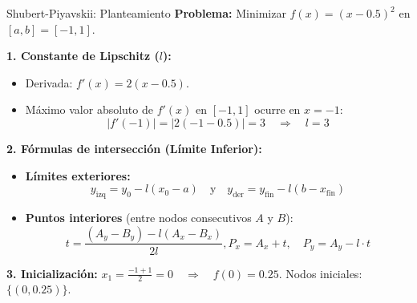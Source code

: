 \begin{frame}{Shubert-Piyavskii: Planteamiento}
    \textbf{Problema:} Minimizar \(f(x) = (x - 0.5)^2\) en \([a, b] = [-1, 1]\).
    
    \vspace{0.3cm}
    \textbf{1. Constante de Lipschitz (\(l\)):}
    \begin{itemize}
        \item Derivada: \(f'(x) = 2(x - 0.5)\).
        \item Máximo valor absoluto de \(f'(x)\) en \([-1, 1]\) ocurre en \(x = -1\): 
        \[ |f'(-1)| = |2(-1 - 0.5)| = 3 \quad \Rightarrow \quad l = 3 \]
    \end{itemize}

    \textbf{2. Fórmulas de intersección (Límite Inferior):}
    \begin{itemize}
        \item \textbf{Límites exteriores:}
        \[ y_{\text{izq}} = y_0 - l(x_0 - a) \quad \text{y} \quad y_{\text{der}} = y_{\text{fin}} - l(b - x_{\text{fin}}) \]
        \item \textbf{Puntos interiores} (entre nodos consecutivos \(A\) y \(B\)):
        \[ t = \frac{(A_y - B_y) - l(A_x - B_x)}{2l}, P_x = A_x + t, \quad P_y = A_y - l \cdot t \]
    \end{itemize}

    \textbf{3. Inicialización:}
    \(x_1 = \frac{-1 + 1}{2} = 0 \quad \Rightarrow \quad f(0) = 0.25\). Nodos iniciales: \(\{(0, 0.25)\}\).
\end{frame}


